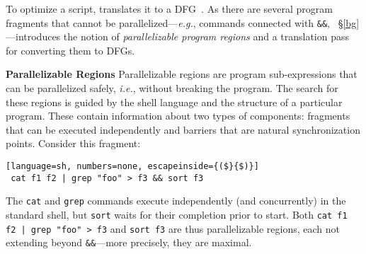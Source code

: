 \documentclass[letterpaper,twocolumn,10pt]{article}
\newcommand{\eg}{{\em e.g.}, }
\newcommand{\ie}{{\em i.e.}, }
\newcommand{\heading}[1]{\vspace{4pt}\noindent\textbf{#1}\enspace}
\newcommand{\ttt}[1]{\texttt{#1}}
\newcommand{\kk}[1]{[{\color{magenta}kk: #1}]}
\begin{document}
To optimize a script, \sys translates it to a DFG~.
As there are several program fragments that cannot be parallelized---\eg commands connected with \ttt{\&\&}, ~\S\ref{bg}---\sys introduces the notion of \emph{parallelizable program regions} and a translation pass for converting them to DFGs.




\heading{Parallelizable Regions}
%
%
Parallelizable regions are program sub-expressions that can be parallelized safely, \ie without breaking the program.
The search for these regions is guided by the shell language and the structure of a particular program.
These contain information about two types of components:
  fragments that can be executed independently and barriers that are natural synchronization points. %
Consider this fragment:

\begin{lstlisting}[language=sh, numbers=none, escapeinside={($}{$)}]
 cat f1 f2 | grep "foo" > f3 && sort f3 
\end{lstlisting}

\noindent
The \ttt{cat} and \ttt{grep} commands execute independently (and concurrently) in the standard shell, but \ttt{sort} waits for their completion prior to start.
Both \ttt{cat f1 f2 | grep "foo" > f3} and \ttt{sort f3} are thus parallelizable regions, each not extending beyond \ttt{\&\&}---more precisely, they are maximal.
\end{document}
